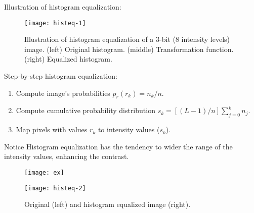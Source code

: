 
\begin{frame}
Illustration of histogram equalization:
\begin{figure}
\centering
\texttt{[image: histeq-1]}
\caption{Illustration of histogram equalization of a 3-bit (8 intensity levels) image. (left) Original
histogram. (middle) Transformation function. (right) Equalized histogram.}
\end{figure}
\end{frame}


\begin{frame}
Step-by-step histogram equalization:
\begin{enumerate}
\item Compute image's probabilities $p_{r}(r_{k}) = n_{k}/n$.
\item Compute cumulative probability distribution $s_{k} = \left [\left (L-1 \right )/n\right ]\sum_{j=0}^{k}n_{j}$.
\item Map pixels with values $r_{k}$ to intensity values ($s_{k}$).
\end{enumerate}
\begin{block}{Notice}
Histogram equalization has the tendency to wider the range of the intensity values, enhancing the contrast.
\end{block}
\end{frame}


\begin{frame}
\begin{figure}[!h]
\centering
\texttt{[image: ex]}
\end{figure}
\end{frame}


\begin{frame}
\begin{figure}
\centering
\texttt{[image: histeq-2]}
\caption{Original (left) and histogram equalized image (right).}
\end{figure}
\end{frame}

